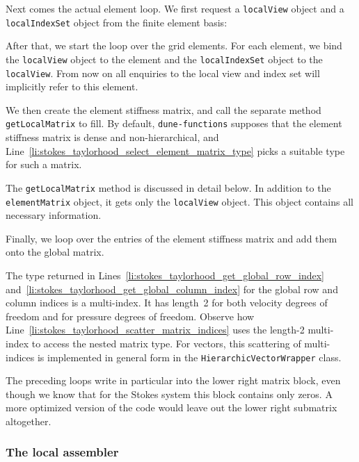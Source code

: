 \documentclass[a4paper,10pt,headings=normal,bibliography=totoc]{scrartcl}
\newcommand{\cpp}[1]{\lstinline[basicstyle=\ttfamily]!#1!}
\newcommand{\dunemodule}[1]{\texttt{#1}}
\begin{document}
Next comes the actual element loop.  We first request a \cpp{localView} object and a \cpp{localIndexSet} object
from the finite element basis:
%

%
After that, we start the loop over the grid elements.  For each element, we bind the \cpp{localView} object
to the element and the \cpp{localIndexSet} object to
the \cpp{localView}.  From now on all enquiries to the local view and index set will implicitly refer to this element.
%

%
We then create the element stiffness matrix, and call the separate method \cpp{getLocalMatrix} to fill.
By default, \dunemodule{dune-functions} supposes that the element stiffness matrix is dense and non-hierarchical,
and Line~\ref{li:stokes_taylorhood_select_element_matrix_type}
picks a suitable type for such a matrix.
%

%
The \cpp{getLocalMatrix} method is discussed in detail below.
In addition to the \cpp{elementMatrix} object, it gets only the \cpp{localView} object.  This object contains
all necessary information.

Finally, we loop over the entries of the element stiffness matrix and add them onto the global matrix.
%

%
The type returned in Lines~\ref{li:stokes_taylorhood_get_global_row_index} and~\ref{li:stokes_taylorhood_get_global_column_index}
for the global row and column indices is a multi-index.  It has length~2 for both velocity degrees of freedom and for
pressure degrees of freedom.  Observe how Line~\ref{li:stokes_taylorhood_scatter_matrix_indices} uses the length-2
multi-index to access the nested matrix type.  For vectors, this scattering of multi-indices is implemented
in general form in the \cpp{HierarchicVectorWrapper} class.

The preceding loops write in particular into the lower right matrix block, even though we know that for the Stokes
system this block contains only zeros.  A more optimized version of the code would leave out the lower right
submatrix altogether.

\subsubsection{The local assembler}
\end{document}
